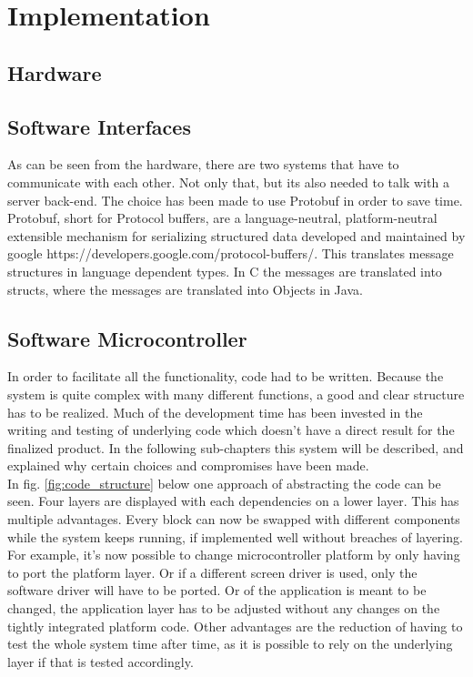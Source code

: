 \chapter{Implementation}
\label{chap:implementation}

\section{Hardware}
\label{sec:hardware}

\section{Software Interfaces}
As can be seen from the hardware, there are two systems that have to communicate with each other. Not only that, but its also needed to talk with a server back-end. The choice has been made to use Protobuf in order to save time. Protobuf, short for Protocol buffers, are a language-neutral, platform-neutral extensible mechanism for serializing structured data developed and maintained by google https://developers.google.com/protocol-buffers/. This translates message structures in language dependent types. In C the messages are translated into structs, where the messages are translated into Objects in Java.
\section{Software Microcontroller}
\label{sec:software}
In order to facilitate all the functionality, code had to be written. Because the system is quite complex with many different functions, a good and clear structure has to be realized. Much of the development time has been invested in the writing and testing of underlying code which doesn’t have a direct result for the finalized product. In the following sub-chapters this system will be described, and explained why certain choices and compromises have been made.\\
In fig. \ref{fig:code_structure} below one approach of abstracting the code can be seen. Four layers are displayed with each dependencies on a lower layer. This has multiple advantages. Every block can now be swapped with different components while the system keeps running, if implemented well without breaches of layering.\newpar
For example, it's now possible to change microcontroller platform by only having to port the platform layer. Or if a different screen driver is used, only the software driver will have to be ported. Or of the application is meant to be changed, the application layer  has to be adjusted without any changes on the tightly integrated platform code. Other advantages are the reduction of having to test the whole system time after time, as it is possible to rely on the underlying layer if that is tested accordingly.\\

